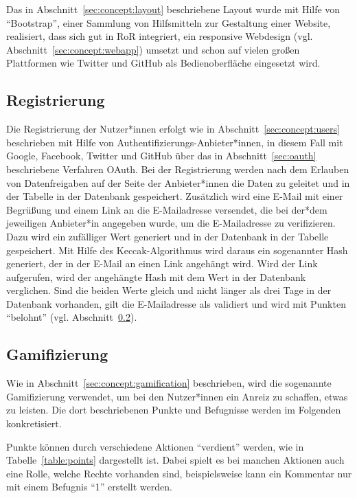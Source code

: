 Das in Abschnitt~\ref{sec:concept:layout} beschriebene Layout wurde mit Hilfe 
von 
"`Bootstrap"', einer Sammlung von Hilfsmitteln zur Gestaltung einer Website, 
realisiert, dass sich gut in \ac{RoR} integriert, ein responsive Webdesign 
(vgl. Abschnitt~\ref{sec:concept:webapp}) umsetzt und schon auf vielen großen
Plattformen wie Twitter und GitHub als Bedienoberfläche eingesetzt wird.

\subsection{Registrierung}
\label{sec:implementation:users}

Die Registrierung der Nutzer*innen erfolgt wie in 
Abschnitt~\ref{sec:concept:users} beschrieben mit Hilfe von 
Authentifizierungs-Anbieter*innen, in diesem Fall mit Google, Facebook, Twitter 
und GitHub über das in Abschnitt~\ref{sec:oauth} beschriebene Verfahren OAuth.
Bei der Registrierung werden nach dem Erlauben von Datenfreigaben auf der Seite 
der Anbieter*innen die Daten zu \name geleitet und in der Tabelle  
in der Datenbank gespeichert.
Zusätzlich wird eine E-Mail mit einer Begrüßung und einem Link an die 
E-Mailadresse versendet, die bei der*dem jeweiligen Anbieter*in angegeben wurde, 
um die E-Mailadresse zu verifizieren.
Dazu wird ein zufälliger Wert generiert und in der Datenbank in der Tabelle 
 gespeichert. Mit Hilfe des Keccak-Algorithmus \cite{bdpv11} 
wird daraus ein sogenannter Hash generiert, der in der E-Mail an einen Link 
angehängt wird. Wird der Link aufgerufen, wird der angehängte Hash mit dem Wert 
in der Datenbank verglichen. Sind die beiden Werte gleich und nicht länger als 
drei Tage in der Datenbank vorhanden, gilt die E-Mailadresse als validiert und 
wird mit Punkten "`belohnt"' (vgl. 
Abschnitt~\ref{sec:implementation:gamification}).

\subsection{Gamifizierung}
\label{sec:implementation:gamification}

Wie in Abschnitt~\ref{sec:concept:gamification} beschrieben, wird die 
sogenannte Gamifizierung verwendet, um bei den Nutzer*innen ein Anreiz zu 
schaffen, etwas zu leisten. Die dort beschriebenen Punkte und Befugnisse werden 
im Folgenden konkretisiert.

Punkte können durch verschiedene Aktionen "`verdient"' werden, wie in
Tabelle~\ref{table:points} dargestellt ist. Dabei spielt es bei manchen 
Aktionen auch eine Rolle, welche Rechte vorhanden sind, beispielsweise 
kann ein Kommentar nur mit einem Befugnis "`1"' erstellt werden.

